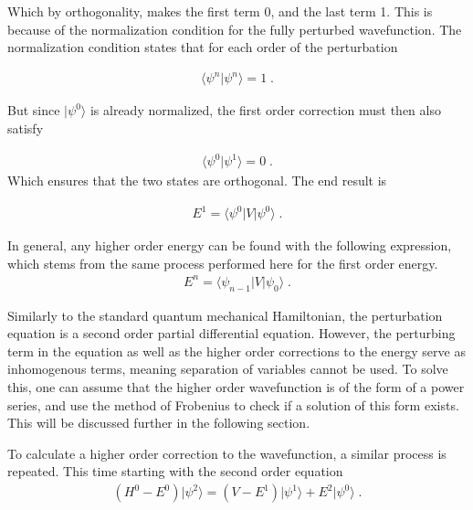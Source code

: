         \noindent Which by orthogonality, makes the first term 0, and the last term 1. This is because of the normalization condition for the fully perturbed wavefunction. The normalization condition states that for each order of the perturbation 
        
        \begin{align}
            \langle \psi^n \vert \psi^n \rangle = 1\;.
        \end{align}

        \noindent But since $\vert \psi^0 \rangle$ is already normalized, the first order correction must then also satisfy 

        \begin{align}
            \langle \psi^0 \vert \psi^1 \rangle = 0\;.
        \end{align}
        \noindent Which ensures that the two states are orthogonal. The end result is

        \begin{align}
            E^1 = \langle \psi^0 \vert V \vert \psi^0 \rangle\;.
        \end{align}

        In general, any higher order energy can be found with the following expression, which stems from the same process performed here for the first order energy.
        \begin{align}
            E^n = \langle \psi_{n-1} \vert V \vert \psi_0 \rangle\;.
        \end{align}

        \noindent Similarly to the standard quantum mechanical Hamiltonian, the perturbation equation is a second order partial differential equation. However, the perturbing term in the equation as well as the higher order corrections to the energy serve as inhomogenous terms, meaning separation of variables cannot be used. To solve this, one can assume that the higher order wavefunction is of the form of a power series, and use the method of Frobenius to check if a solution of this form exists. This will be discussed further in the following section. 

        To calculate a higher order correction to the wavefunction, a similar process is repeated. This time starting with the second order equation
        \begin{align}
            \left( H^0 - E^0 \right) \vert \psi^2 \rangle = \left(V - E^1 \right) \vert \psi^1 \rangle + E^2 \vert \psi^0 \rangle\;.
        \end{align}

